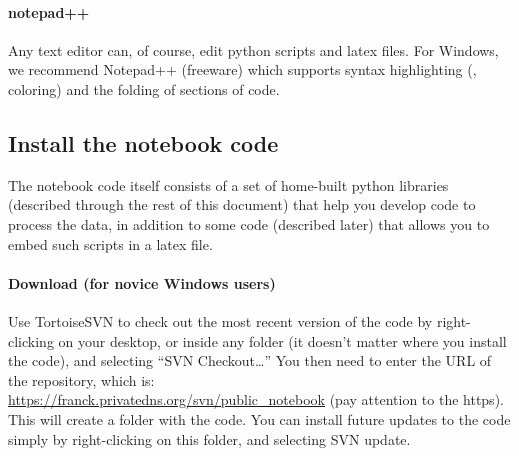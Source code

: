 \paragraph{notepad++}
Any text editor can, of course, edit
    python scripts and latex files.
For Windows,
    we recommend Notepad++ (freeware)
    which supports syntax highlighting (\ie, coloring)
    and the folding of sections of code.
\subsection{Install the notebook code}
The notebook code itself consists of a set of home-built
    python libraries
    (described through the rest of this document)
    that help you develop code to process the data,
    in addition to some code (described later)
    that allows you to embed such scripts in a latex file.
\paragraph{Download (for novice Windows users)}
Use TortoiseSVN to check out the
    most recent version of the code
    by right-clicking on your desktop,
    or inside any folder
    (it doesn't matter where you install the code),
    and selecting ``SVN Checkout\ldots''
You then need to enter the URL of the repository, which is:
    \\ \url{https://franck.privatedns.org/svn/public\_notebook}
    (pay attention to the https).\\ 
This will create a folder with the code.
You can install future updates to the code
    simply by right-clicking on this folder,
    and selecting SVN update.
